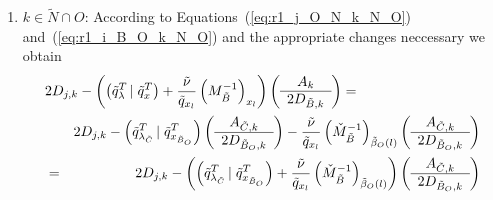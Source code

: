 \documentclass[a4paper]{article}
\begin{document}
\begin{enumerate}
\item $k \in \tilde{N} \cap O$:
According to Equations~(\ref{eq:r1_j_O_N_k_N_O})
and~(\ref{eq:r1_i_B_O_k_N_O}) and the appropriate changes neccessary we obtain
\begin{eqnarray}
\lefteqn{
2D_{j,k}-\left(
          \left(\tilde{q}_{\lambda}^{T}\left|\right. \tilde{q}_{x}^{T}\right)
	  +\frac{\tilde{\nu}}{\tilde{q}_{x_{l}}}
	  \left(M_{\tilde{B}}^{-1}\right)_{x_{l}}
	\right)
\left(\begin{array}{c}
        A_{k} \\
	\hline
	2D_{\tilde{B},k}
      \end{array}
\right)
=}
\nonumber \\
&&
2D_{j, k}
-\left(\tilde{q}_{\lambda_{\tilde{C}}}^{T}\left|\right.
  \tilde{q}_{x_{\tilde{B}_{O}}}^{T}\right)
\left(\begin{array}{c}
        A_{\tilde{C}, k} \\
	\hline
	2D_{\tilde{B}_{O}, k}
      \end{array}
\right)
-\frac{\tilde{\nu}}{\tilde{q}_{x_{l}}}
\left(\check{M}_{\tilde{B}}^{-1}\right)_{\tilde{\beta}_{O}(l)}
\left(\begin{array}{c}
        A_{\tilde{C}, k} \\
	\hline
	2D_{\tilde{B}_{O}, k}
      \end{array}
\right)
\nonumber \\
&=&
2D_{j, k}
-\left(
  \left(\tilde{q}_{\lambda_{\tilde{C}}}^{T}\left|\right.
  \tilde{q}_{x_{\tilde{B}_{O}}}^{T}\right)
  +\frac{\tilde{\nu}}{\tilde{q}_{x_{l}}}
  \left(\check{M}_{\tilde{B}}^{-1}\right)_{\tilde{\beta}_{O}(l)}
\right)
\left(\begin{array}{c}
        A_{\tilde{C}, k} \\
	\hline
	2D_{\tilde{B}_{O}, k}
      \end{array}
\right) 
\end{eqnarray}
\end{enumerate}
\end{document}
